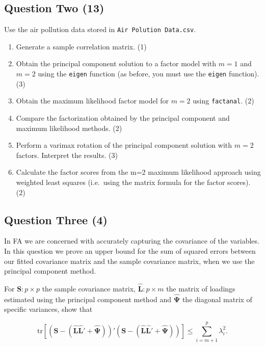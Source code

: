 \documentclass[
  letterpaper,
  DIV=11,
  numbers=noendperiod]{scrartcl}
\providecommand{\tightlist}{%
  \setlength{\itemsep}{0pt}\setlength{\parskip}{0pt}}\usepackage{longtable,booktabs,array}
\begin{document}
\hypertarget{question-two-13}{%
\subsection{Question Two (13)}\label{question-two-13}}

Use the air pollution data stored in \texttt{Air\ Polution\ Data.csv}.

\begin{enumerate}
\def\labelenumi{\alph{enumi}.}
\tightlist
\item
  Generate a sample correlation matrix. (1)
\item
  Obtain the principal component solution to a factor model with \(m=1\)
  and \(m=2\) using the \texttt{eigen} function (as before, you must use
  the \texttt{eigen} function). (3)
\item
  Obtain the maximum likelihood factor model for \(m=2\) using
  \texttt{factanal}. (2)
\item
  Compare the factorization obtained by the principal component and
  maximum likelihood methods. (2)
\item
  Perform a varimax rotation of the principal component solution with
  \(m=2\) factors. Interpret the results. (3)
\item
  Calculate the factor scores from the m=2 maximum likelihood approach
  using weighted least squares (i.e.~using the matrix formula for the
  factor scores). (2)
\end{enumerate}

\hypertarget{question-three-4}{%
\subsection{Question Three (4)}\label{question-three-4}}

In FA we are concerned with accurately capturing the covariance of the
variables. In this question we prove an upper bound for the sum of
squared errors between our fitted covariance matrix and the sample
covariance matrix, when we use the principal component method.

For \(\mathbf{S}:p\times p\) the sample covariance matrix,
\(\hat{\mathbf{L}}:p\times m\) the matrix of loadings estimated using
the principal component method and \(\hat{\mathbf{\Psi}}\) the diagonal
matrix of specific variances, show that

\[
\mathrm{tr}[(\mathbf{S}-(\hat{\mathbf{L}}\hat{\mathbf{L}}' + \hat{\mathbf{\Psi}}))'(\mathbf{S}-(\hat{\mathbf{L}}\hat{\mathbf{L}}' + \hat{\mathbf{\Psi}}))]\leq \sum_{i=m+1}^p\lambda_i^2.
\]
\end{document}
